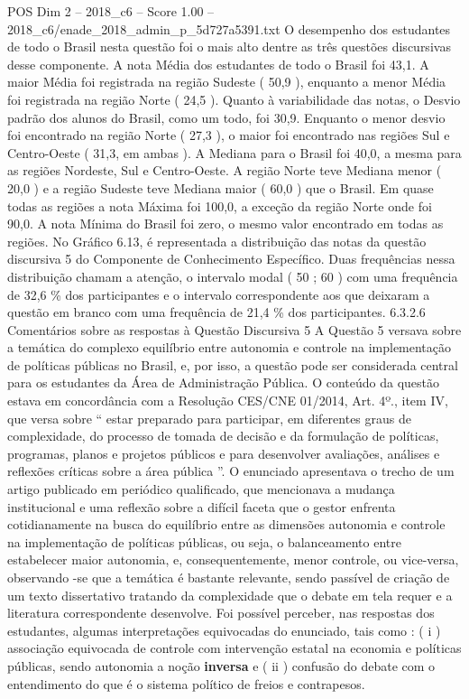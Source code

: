 \begin{textsample}{POS Dim 2 – 2018\_c6 – Score 1.00 – 2018\_c6/enade\_2018\_admin\_p\_5d727a5391.txt}
O desempenho dos estudantes de todo o Brasil nesta questão foi o mais alto dentre as três questões discursivas desse componente.
A nota Média dos estudantes de todo o Brasil foi 43,1.
A maior Média foi registrada na região Sudeste ( 50,9 ), enquanto a menor Média foi registrada na região Norte ( 24,5 ).
Quanto à variabilidade das notas, o Desvio padrão dos alunos do Brasil, como um todo, foi 30,9.
Enquanto o menor desvio foi encontrado na região Norte ( 27,3 ), o maior foi encontrado nas regiões Sul e Centro-Oeste ( 31,3, em ambas ).
A Mediana para o Brasil foi 40,0, a mesma para as regiões Nordeste, Sul e Centro-Oeste.
A região Norte teve Mediana menor ( 20,0 ) e a região Sudeste teve Mediana maior ( 60,0 ) que o Brasil.
Em quase todas as regiões a nota Máxima foi 100,0, a exceção da região Norte onde foi 90,0.
A nota Mínima do Brasil foi zero, o mesmo valor encontrado em todas as regiões.
No Gráfico 6.13, é representada a distribuição das notas da questão discursiva 5 do Componente de Conhecimento Específico.
Duas frequências nessa distribuição chamam a atenção, o intervalo modal ( 50 ; 60 ) com uma frequência de 32,6 \% dos participantes e o intervalo correspondente aos que deixaram a questão em branco com uma frequência de 21,4 \% dos participantes. 6.3.2.6 Comentários sobre as respostas à Questão Discursiva 5 A Questão 5 versava sobre a temática do complexo equilíbrio entre autonomia e controle na implementação de políticas públicas no Brasil, e, por isso, a questão pode ser considerada central para os estudantes da Área de Administração Pública.
O conteúdo da questão estava em concordância com a Resolução CES/CNE 01/2014, Art. 4º., item IV, que versa sobre “ estar preparado para participar, em diferentes graus de complexidade, do processo de tomada de decisão e da formulação de políticas, programas, planos e projetos públicos e para desenvolver avaliações, análises e reflexões críticas sobre a área pública ”.
O enunciado apresentava o trecho de um artigo publicado em periódico qualificado, que mencionava a mudança institucional e uma reflexão sobre a difícil faceta que o gestor enfrenta cotidianamente na busca do equilíbrio entre as dimensões autonomia e controle na implementação de políticas públicas, ou seja, o balanceamento entre estabelecer maior autonomia, e, consequentemente, menor controle, ou vice-versa, observando -se que a temática é bastante relevante, sendo passível de criação de um texto dissertativo tratando da complexidade que o debate em tela requer e a literatura correspondente desenvolve.
Foi possível perceber, nas respostas dos estudantes, algumas interpretações equivocadas do enunciado, tais como : ( i ) associação equivocada de controle com intervenção estatal na economia e políticas públicas, sendo autonomia a noção \textbf{inversa} e ( ii ) confusão do debate com o entendimento do que é o sistema político de freios e contrapesos.

\end{textsample}
